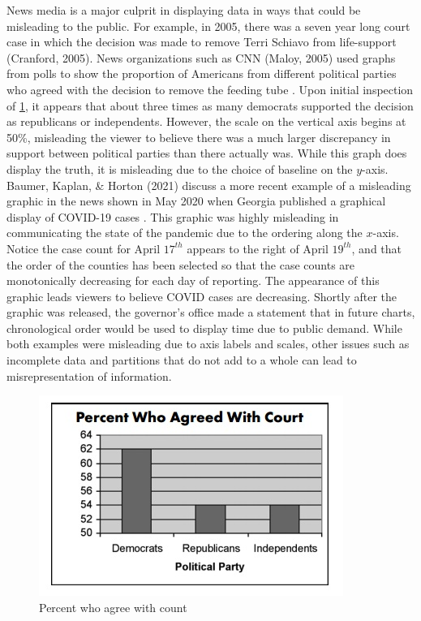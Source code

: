 \documentclass[print]{nuthesis}
\begin{document}

News media is a major culprit in displaying data in ways that could be misleading to the public. For example, in 2005, there was a seven year long court case in which the decision was made to remove Terri Schiavo from life-support (Cranford, 2005).
News organizations such as CNN (Maloy, 2005) used graphs from polls to show the proportion of Americans from different political parties who agreed with the decision to remove the feeding tube .
Upon initial inspection of \cref{fig:percent-who-agree-with-count}, it appears that about three times as many democrats supported the decision as republicans or independents.
However, the scale on the vertical axis begins at 50\%, misleading the viewer to believe there was a much larger discrepancy in support between political parties than there actually was.
While this graph does display the truth, it is misleading due to the choice of baseline on the \(y\)-axis.
Baumer, Kaplan, \& Horton (2021) discuss a more recent example of a misleading graphic in the news shown in May 2020 when Georgia published a graphical display of COVID-19 cases .
This graphic was highly misleading in communicating the state of the pandemic due to the ordering along the \(x\)-axis.
Notice the case count for April \(17^{th}\) appears to the right of April \(19^{th}\), and that the order of the counties has been selected so that the case counts are monotonically decreasing for each day of reporting.
The appearance of this graphic leads viewers to believe COVID cases are decreasing.
Shortly after the graphic was released, the governor's office made a statement that in future charts, chronological order would be used to display time due to public demand. While both examples were misleading due to axis labels and scales, other issues such as incomplete data and partitions that do not add to a whole can lead to misrepresentation of information.

\begin{figure}[tbp]

{\centering \includegraphics[width=0.85\linewidth,]{images/percent-who-agree-with-count} 

}

\caption{Percent who agree with count}\label{fig:percent-who-agree-with-count}
\end{figure}
\end{document}
